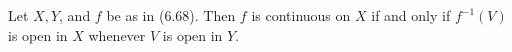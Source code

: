 Let $X, Y$, and $f$ be as in (6.68). Then $f$ is continuous on $X$ if and only if $f^{-1}(V)$ is open in $X$ whenever $V$ is open in $Y$.